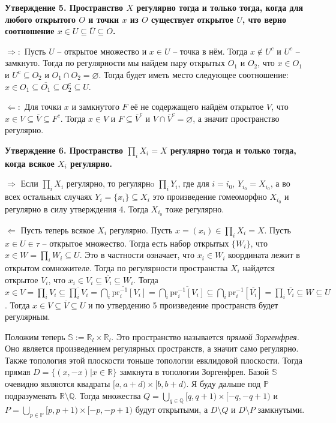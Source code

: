 \documentclass{article}
\begin{document}
\begin{enumerate}
        \textbf{Утверждение 5. Пространство $X$ регулярно тогда и только тогда,
        когда для любого открытого $O$ и точки $x$ из $O$ существует открытое
        $U$, что верно соотношение $x\in U\subseteq\overline{U}\subseteq O$.}
        
        $\Rightarrow:$ Пусть $U$ – открытое множество и $x\in U$ – точка в нём.
        Тогда $x\notin U^c$ и $U^c$ – замкнуто. Тогда по регулярности мы найдем
        пару открытых $O_1$ и $O_2$, что $x\in O_1$ и $U^c\subseteq O_2$ и
        $O_1\cap O_2=\varnothing$. Тогда будет иметь место следующее соотношение:
        $x\in O_1\subseteq\overline{O_1}\subseteq O_2^c\subseteq U$.

        $\Leftarrow:$ Для точки $x$ и замкнутого $F$ её не содержащего найдём
        открытое $V$, что $x\in V\subseteq\overline{V}\subseteq F^c$. Тогда
        $x\in V$ и $F\subseteq\overline{V}^c$ и $V\cap\overline{V}^c=\varnothing$,
        а значит пространство регулярно.

        \textbf{Утверждение 6. Пространство $\prod_iX_i=X$ регулярно тогда и
        только тогда, когда всякое $X_i$ регулярно.}

        $\Rightarrow$ Если $\prod_i X_i$ регулярно, то регулярнo $\prod_i Y_i$,
        где для $i=i_0$, $Y_{i_0}=X_{i_0}$, а во всех остальных случаях $Y_i=\{
        x_i\}\subseteq X_i$ это произведение гомеоморфно $X_{i_0}$ и регулярно в
        силу утверждения 4. Тогда $X_{i_0}$ тоже регулярно.

        $\Leftarrow$ Пусть теперь всякое $X_i$ регулярно. Пусть $x=(x_i)\in
        \prod_iX_i=X$. Пусть $x\in U\in\tau$ – открытое множество. Тогда есть
        набор открытых $\{W_i\}$, что $x\in W=\prod_iW_i\subseteq U$. Это в частности
        означает, что $x_i\in W_i$ координата лежит в открытом сомножителе.
        Тогда по регулярности пространства $X_i$ найдется открытое $V_i$, что
        $x_i\in V_i\subseteq\overline{V_i}\subseteq W_i$. Тогда $x\in V=\prod_i
        V_i\subseteq\overline{\prod_i V_i}=\overline{\bigcap_i\text{pr}_i^{-1}
        [V_i]}=\bigcap_i\overline{\text{pr}_i^{-1}[V_i]}\subseteq
        \bigcap_i\text{pr}_i^{-1}[\overline{V_i}]=\prod_i\overline{V_i}\subseteq
        W\subseteq U $. Тогда $x\in V\subseteq\overline{V}\subseteq{U}$ и по
        утвердению 5 произведение пространств будет регулярным.

        Положим теперь $\mathbb{S}:=\mathbb{R}_l\times \mathbb{R}_l$. Это
        пространство называется \emph{прямой Зоргенфрея}. Оно является
        произведением регулярных пространств, а значит само регулярно. Также
        топология этой плоскости тоньше топологии евклидовой плоскости. Тогда
        прямая $D=\{(x,-x)|x\in\mathbb{R}\}$ замкнута в топологии Зоргенфрея.
        Базой $\mathbb{S}$ очевидно являются квадраты $[a,a+d)\times[b,b+d)$.
        Я буду дальше под $\mathbb{P}$ подразумевать $\mathbb{R}\setminus
        \mathbb{Q}$. Тогда множества $Q=\bigcup_{q\in\mathbb{Q}}[q,q+1)\times
        [-q,-q+1)$ и $P=\bigcup_{p\in\mathbb{P}}[p,p+1)\times[-p,-p+1)$ будут
        открытыми, а $D\setminus Q$ и $D\setminus P$ замкнутыми.


\end{enumerate}
\end{document}
